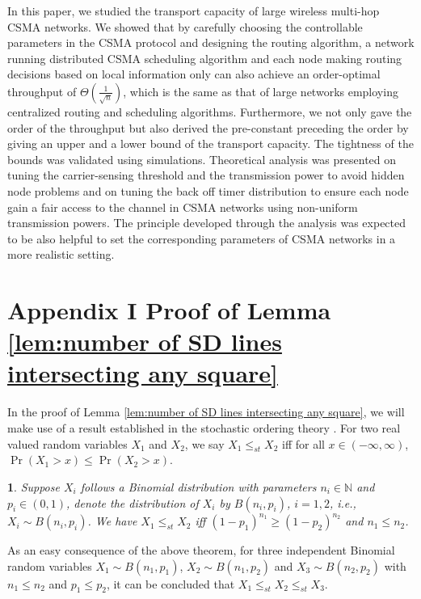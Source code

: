 \documentclass[english]{IEEEtran}
\theoremstyle{plain}
\newtheorem{thm}{\protect\theoremname}
\theoremstyle{plain}
\theoremstyle{plain}
\theoremstyle{remark}
\providecommand{\theoremname}{Theorem}
\begin{document}
In this paper, we studied the transport capacity of large wireless
multi-hop CSMA networks. We showed that by carefully choosing the
controllable parameters in the CSMA protocol and designing the routing
algorithm, a network running distributed CSMA scheduling algorithm
and each node making routing decisions based on local information
only can also achieve an order-optimal throughput of $\Theta\left(\frac{1}{\sqrt{n}}\right)$,
which is the same as that of large networks employing centralized
routing and scheduling algorithms. Furthermore, we not only gave the
order of the throughput but also derived the pre-constant preceding
the order by giving an upper and a lower bound of the transport capacity.
The tightness of the bounds was validated using simulations. Theoretical
analysis was presented on tuning the carrier-sensing threshold and
the transmission power to avoid hidden node problems and on tuning
the back off timer distribution to ensure each node gain a fair access
to the channel in CSMA networks using non-uniform transmission powers.
The principle developed through the analysis was expected to be also
helpful to set the corresponding parameters of CSMA networks in a
more realistic setting.


\section*{Appendix I Proof of Lemma \ref{lem:number of SD lines intersecting any square}}

In the proof of Lemma \ref{lem:number of SD lines intersecting any square},
we will make use of a result established in the stochastic ordering
theory \cite{Klenke10Stochastic}. For two real valued random variables
$X_{1}$ and $X_{2}$, we say $X_{1}\leq_{st}X_{2}$ iff for all $x\in\left(-\infty,\infty\right)$,
$\Pr\left(X_{1}>x\right)\leq\Pr\left(X_{2}>x\right)$. 
\begin{thm}
\label{thm:Stochastic Ordering}\cite[Theorem 1(a)]{Klenke10Stochastic}Suppose
$X_{i}$ follows a Binomial distribution with parameters $n_{i}\in\mathbb{N}$
and $p_{i}\in\left(0,1\right)$, denote the distribution of $X_{i}$
by $B\left(n_{i},p_{i}\right)$, $i=1,2$, i.e., $X_{i}\sim B\left(n_{i},p_{i}\right)$.
We have $X_{1}\leq_{st}X_{2}$ iff $\left(1-p_{1}\right)^{n_{1}}\geq\left(1-p_{2}\right)^{n_{2}}$
and $n_{1}\leq n_{2}$. 
\end{thm}
As an easy consequence of the above theorem, for three independent
Binomial random variables $X_{1}\sim B\left(n_{1},p_{1}\right)$,
$X_{2}\sim B\left(n_{1},p_{2}\right)$ and $X_{3}\sim B\left(n_{2},p_{2}\right)$
with $n_{1}\leq n_{2}$ and $p_{1}\leq p_{2}$, it can be concluded
that $X_{1}\leq_{st}X_{2}\leq_{st}X_{3}$. 
\end{document}
